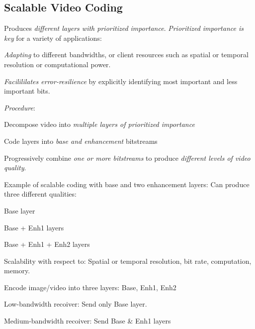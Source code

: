 \begin{compactdesc}
\section{Scalable Video Coding}
Produces \emph{different layers with prioritized importance}. \emph{Prioritized importance is key} for a variety of applications:\\
\begin{enumerate*}[label=\protect\circled{\arabic*},itemjoin=]
	\item \emph{Adapting} to different bandwidths, or client resources such as spatial or temporal resolution or computational power.\\
	\item \emph{Facilililates error-resilience} by explicitly identifying most important and less important bits.\\
\end{enumerate*}
\emph{Procedure}:\\
\begin{enumerate*}[label=\protect\circled{\arabic*},itemjoin=]
	\item Decompose video into \emph{multiple layers of prioritized importance}\\
	\item Code layers into \emph{base and enhancement} bitstreams\\
	\item Progressively combine \emph{one or more bitstreams} to produce \emph{different levels of video quality}.\\
\end{enumerate*}
Example of scalable coding with base and two enhancement layers: Can produce three different qualities:
\begin{enumerate*}[label=\protect\circled{\arabic*}]
	\item Base layer
	\item Base + Enh1 layers
	\item Base + Enh1 + Enh2 layers
\end{enumerate*}
Scalability with respect to: Spatial or temporal resolution, bit rate, computation, memory.
\item[\lp{Example}]
	\begin{itemize*}[label=\colorbullet]
		\item Encode image/video into three layers: Base, Enh1, Enh2
		\item Low-bandwidth recoiver: Send only Base layer.
		\item Medium-bandwidth recoiver: Send Base \& Enh1 layers

\end{itemize*}
\end{compactdesc}
